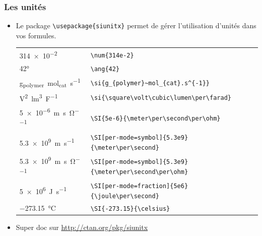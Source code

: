 \begin{frame}[fragile]
  \frametitle{Les unités}
  \begin{itemize}
    \item Le package \lstinline|\usepackage{siunitx}| permet de gérer l'utilisation d'unités dans vos formules.
        \begin{center}
          \begin{tabular}{ll}
            \num{314e-2} & \lstinline|\num{314e-2}|\\
            \ang{42} & \lstinline|\ang{42}|\\
            \si{g_{polymer}~mol_{cat}.s^{-1}} &
            \lstinline|\si{g_{polymer}~mol_{cat}.s^{-1}}|\\
            \si{\square\volt\cubic\lumen\per\farad} &
            \lstinline|\si{\square\volt\cubic\lumen\per\farad}|\\
            \SI{5e-6}{\meter\per\second\per\ohm} &
            \lstinline|\SI{5e-6}{\meter\per\second\per\ohm}|\\
            \SI[per-mode=symbol]{5.3e9}{\meter\per\second} &
            \lstinline|\SI[per-mode=symbol]{5.3e9}{\meter\per\second}|\\
            \SI[per-mode=symbol]{5.3e9}{\meter\per\second\per\ohm} &
            \lstinline|\SI[per-mode=symbol]{5.3e9}{\meter\per\second\per\ohm}|\\
            \SI[per-mode=fraction]{5e6}{\joule\per\second} &
            \lstinline|\SI[per-mode=fraction]{5e6}{\joule\per\second}|\\
            \SI{-273.15}{\celsius} &
            \lstinline|\SI{-273.15}{\celsius}|
          \end{tabular}
        \end{center}
    \item Super doc sur \url{http://ctan.org/pkg/siunitx}
  \end{itemize}
\end{frame}

